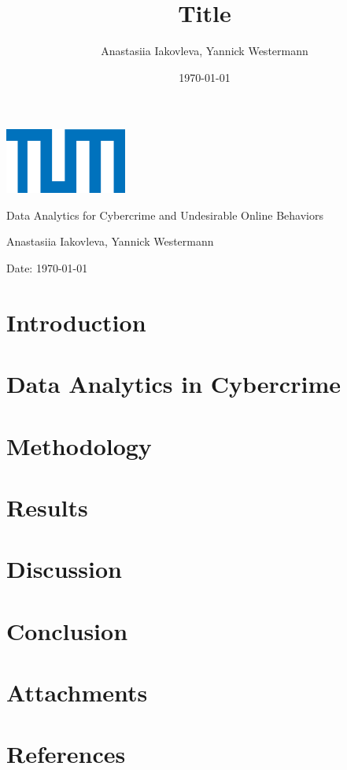 \documentclass{article}
\title{Title}
\author{Anastasiia Iakovleva, Yannick Westermann}
\date{\today}
\renewcommand\maketitle{
  \begin{titlepage}
    \centering
    \includegraphics[width=0.3\textwidth]{./assets/tum-logo.png} 
    \vspace{1cm}

    \Large
    Data Analytics for Cybercrime and Undesirable Online Behaviors
    \vspace{2cm}

    \Huge
    \thetitle
    \vspace{2cm}

    \Large
    Anastasiia Iakovleva, Yannick Westermann
    \vspace{1cm}

    \normalsize
    Date: \today
    \vspace{1cm}

    \begin{abstract}
        \lipsum[1]
    \end{abstract}
  \end{titlepage}
}
\begin{document}
\maketitle

\newpage
\tableofcontents
\newpage

\section{Introduction}\label{sec:introduction}


\section{Data Analytics in Cybercrime}\label{sec:data-analytics}


\section{Methodology}\label{sec:methodology}


\section{Results}\label{sec:results}


\section{Discussion}\label{sec:discussion}


\section{Conclusion}\label{sec:conclusion}


\section{Attachments}\label{sec:attachments}


\section{References}\label{sec:references}

\end{document}
